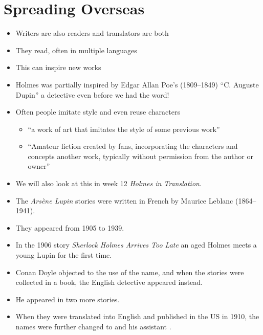 \documentclass[a4paper,landscape,headrule,footrule,xetex]{foils}
\begin{document}





\section{Spreading Overseas }


\begin{itemize}
\item Writers are also readers and translators are both
\item They read, often in multiple languages
\item This can inspire new works
\item Holmes was partially inspired by Edgar Allan Poe's (1809–1849)
  ``C. Auguste Dupin'' a detective even before we had the word!
\item Often people imitate style and even reuse characters
  \begin{itemize}
  \item  {} ``a work of art that imitates the style of some previous work''
  \item {} ``Amateur fiction created by fans, incorporating the characters and concepts another work, typically without permission from the author or owner''
  \end{itemize}
\item We will also look at this in week 12 \textit{Holmes in Translation}.
\end{itemize}


\begin{itemize}
\item The \textit{Arsène Lupin} stories were written in French by
  Maurice Leblanc (1864–1941).
\item They appeared from 1905 to 1939.
\item In the 1906 story \textit{Sherlock Holmes Arrives Too Late} an
  aged Holmes meets a young Lupin for the first time.
\item Conan Doyle objected to the use of the name, and when the
  stories were collected in a book, the English detective  appeared instead.
\item He appeared in two more stories.
\item When they were translated into English and published in the US
  in 1910, the names were further changed to 
  and his assistant .

\end{itemize}
\end{document}
